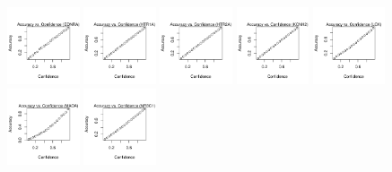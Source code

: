 \documentclass[utf8]{frontiersSCNS} %
\begin{document}
\begin{figure}[h!]
\includegraphics[width=0.19\textwidth]{figures/calibration_plots/ednra_calib.pdf}
\includegraphics[width=0.19\textwidth]{figures/calibration_plots/htr1a_calib.pdf}
\includegraphics[width=0.19\textwidth]{figures/calibration_plots/htr2a_calib.pdf}
\includegraphics[width=0.19\textwidth]{figures/calibration_plots/kcnh2_calib.pdf}
\includegraphics[width=0.19\textwidth]{figures/calibration_plots/lck_calib.pdf}
\includegraphics[width=0.19\textwidth]{figures/calibration_plots/maoa_calib.pdf}
\includegraphics[width=0.19\textwidth]{figures/calibration_plots/nr3c1_calib.pdf}

\end{figure}
\end{document}
